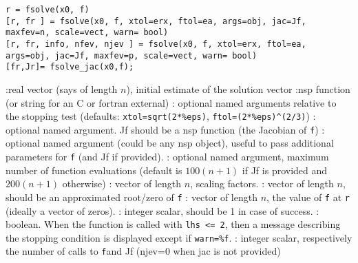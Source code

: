 
\begin{mandesc}
\end{mandesc}

\begin{calling_sequence}
\begin{verbatim}
r = fsolve(x0, f)
[r, fr ] = fsolve(x0, f, xtol=erx, ftol=ea, args=obj, jac=Jf, maxfev=n, scale=vect, warn= bool) 
[r, fr, info, nfev, njev ] = fsolve(x0, f, xtol=erx, ftol=ea, args=obj, jac=Jf, maxfev=p, scale=vect, warn= bool) 
[fr,Jr]= fsolve_jac(x0,f);
\end{verbatim}
\end{calling_sequence}
\begin{parameters}
  \begin{varlist}
    :real vector (says of length $n$), initial estimate of the solution vector
    :nsp function (or string for an C or fortran external)
    : optional named arguments relative to the stopping test (defaults:
    \verb+xtol=sqrt(2*%eps)+, \verb+ftol=(2*%eps)^(2/3)+)
    : optional named argument. Jf should be a nsp function (the Jacobian of \verb+f+)
    : optional named argument (could be any nsp object), useful to pass additional parameters for \verb+f+ (and
    Jf if provided).
    : optional named argument, maximum number of function evaluations (default is $100(n+1)$ if Jf is
    provided and $200(n+1)$ otherwise)
    : vector of length $n$, scaling factors.
    : vector of length $n$, should be an approximated root/zero of \verb+f+ 
    : vector of length $n$, the value of \verb+f+  at \verb+r+ (ideally a vector of zeros).
    : integer scalar, should be 1 in case of success.
    : boolean. When the function is called with \verb+lhs <= 2+, then a message describing the 
    stopping condition is displayed except if \verb+warn=%f+.
    : integer scalar, respectively the number of calls to \verb+f+and Jf (njev=0 when jac is not provided)
  \end{varlist}
\end{parameters}

